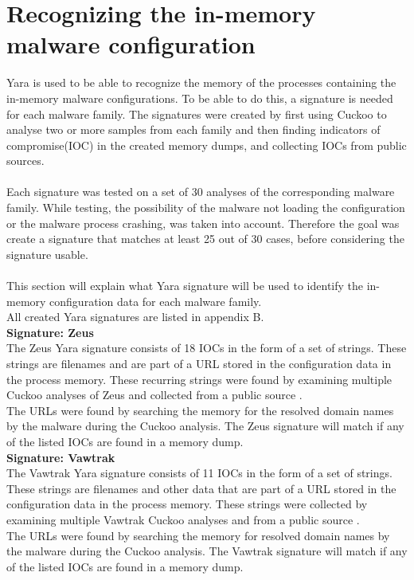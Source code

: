 \documentclass[conference]{IEEEtran}
\begin{document}
\section{Recognizing the in-memory malware configuration}
Yara is used to be able to recognize the memory of the processes containing the in-memory malware configurations. To be able to do this, a signature is needed for each malware family. The signatures were created by first using Cuckoo to analyse two or more samples from each family and then finding indicators of compromise(IOC) in the created memory dumps, and collecting IOCs from public sources. \\\\Each signature was tested on a set of 30 analyses of the corresponding malware family. While testing, the possibility of the malware not loading the configuration or the malware process crashing, was taken into account. Therefore the goal was create a signature that matches at least 25 out of 30 cases, before considering the signature usable. \\\\This section will explain what Yara signature will be used to identify the in-memory configuration data for each malware family.\\ All created Yara signatures are listed in appendix B.\\

\textbf{Signature: Zeus}
\\The Zeus Yara signature consists of 18 IOCs in the form of a set of strings. These strings are filenames and are part of a URL stored in the configuration data in the process memory. These recurring strings were found by examining multiple Cuckoo analyses of Zeus and collected from a public source \cite{zeus-ioc}.\\The URLs were found by searching the memory for the resolved domain names by the malware during the Cuckoo analysis. The Zeus signature will match if any of the listed IOCs are found in a memory dump.\\

\textbf{Signature: Vawtrak}
\\The Vawtrak Yara signature consists of 11 IOCs in the form of a set of strings. These strings are filenames and other data that are part of a URL stored in the configuration data in the process memory. These strings were collected by examining multiple Vawtrak Cuckoo analyses and from a public source \cite{vawtrak-ioc}.\\The URLs were found by searching the memory for resolved domain names by the malware during the Cuckoo analysis. The Vawtrak signature will match if any of the listed IOCs are found in a memory dump.\\
\end{document}
